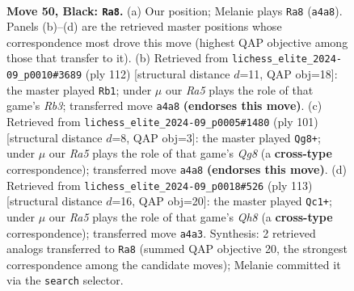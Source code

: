 \documentclass[11pt]{article}
\begin{document}
\clearpage

\begin{figure}[p]\centering
\begin{subfigure}{0.46\textwidth}\centering
\resizebox{\linewidth}{!}{%
\newchessgame
\chessboard[
  setfen={8/1p6/4k3/8/r3P3/8/4Q1PP/1K6 b - - 0 50},
  showmover=false,
  pgfstyle=straightmove, color=movearrow, markmove={a4-a8}
]}
\caption{}
\end{subfigure}\hfill
\begin{subfigure}{0.46\textwidth}\centering
\resizebox{\linewidth}{!}{%
\newchessgame
\chessboard[
  setfen={8/6k1/8/4q2p/8/1R4p1/6P1/6K1 w - - 0 57},
  showmover=false,
  pgfstyle=straightmove, color=movearrow, markmove={b3-b1}
]}
\caption{}
\end{subfigure}
\\[4pt]
\begin{subfigure}{0.46\textwidth}\centering
\resizebox{\linewidth}{!}{%
\newchessgame
\chessboard[
  setfen={4K3/8/p1PQ4/8/1Pk5/8/8/6q1 b - - 0 51},
  showmover=false,
  pgfstyle=straightmove, color=movearrow, markmove={g1-g8}
]}
\caption{}
\end{subfigure}\hfill
\begin{subfigure}{0.46\textwidth}\centering
\resizebox{\linewidth}{!}{%
\newchessgame
\chessboard[
  setfen={1Q6/5k2/4p3/4P1KP/8/6P1/8/7q b - - 7 57},
  showmover=false,
  pgfstyle=straightmove, color=movearrow, markmove={h1-c1}
]}
\caption{}
\end{subfigure}
\caption{\textbf{Move 50, Black: \texttt{Ra8}.} (a) Our position; Melanie plays \texttt{Ra8} (\texttt{a4a8}). Panels (b)--(d) are the retrieved master positions whose correspondence most drove this move (highest QAP objective among those that transfer to it). (b) Retrieved from \texttt{lichess\_elite\_2024-09\_p0010\#3689} (ply 112) [structural distance $d$=11, QAP obj=18]: the master played \texttt{Rb1}; under $\mu$ our \emph{Ra5} plays the role of that game's \emph{Rb3}; transferred move \texttt{a4a8} \textbf{(endorses this move)}. (c) Retrieved from \texttt{lichess\_elite\_2024-09\_p0005\#1480} (ply 101) [structural distance $d$=8, QAP obj=3]: the master played \texttt{Qg8+}; under $\mu$ our \emph{Ra5} plays the role of that game's \emph{Qg8} (a \textbf{cross-type} correspondence); transferred move \texttt{a4a8} \textbf{(endorses this move)}. (d) Retrieved from \texttt{lichess\_elite\_2024-09\_p0018\#526} (ply 113) [structural distance $d$=16, QAP obj=20]: the master played \texttt{Qc1+}; under $\mu$ our \emph{Ra5} plays the role of that game's \emph{Qh8} (a \textbf{cross-type} correspondence); transferred move \texttt{a4a3}. Synthesis: 2 retrieved analogs transferred to \texttt{Ra8} (summed QAP objective 20, the strongest correspondence among the candidate moves); Melanie committed it via the \texttt{search} selector.}
\label{fig:thought-m99}
\end{figure}
\end{document}
